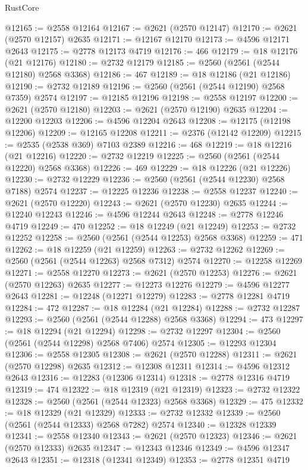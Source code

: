 \begin{lexlean}{RustCore}
\begin{coremodule}
@12165 := @2558 @12164
@12167 := @2621 (@2570 @12147)
@12170 := @2621 (@2570 @12157) @2635
@12171 := @12167 @12170
@12173 := @4596 @12171 @2643
@12175 := @2778 @12173 @4719
@12176 := 466
@12179 := @18 @12176 (@21 @12176)
@12180 := @2732 @12179
@12185 := @2560 (@2561 (@2544 @12180) @2568 @3368)
@12186 := 467
@12189 := @18 @12186 (@21 @12186)
@12190 := @2732 @12189
@12196 := @2560 (@2561 (@2544 @12190) @2568 @7359) @2574
@12197 := @12185 @12196
@12198 := @2558 @12197
@12200 := @2621 (@2570 @12180)
@12203 := @2621 (@2570 @12190) @2635
@12204 := @12200 @12203
@12206 := @4596 @12204 @2643
@12208 := @12175 (@12198 @12206)
@12209 := @12165 @12208
@12211 := @2376 (@12142 @12209)
@12215 := @2535 (@2538 @369) @7103 @2389
@12216 := 468
@12219 := @18 @12216 (@21 @12216)
@12220 := @2732 @12219
@12225 := @2560 (@2561 (@2544 @12220) @2568 @3368)
@12226 := 469
@12229 := @18 @12226 (@21 @12226)
@12230 := @2732 @12229
@12236 := @2560 (@2561 (@2544 @12230) @2568 @7188) @2574
@12237 := @12225 @12236
@12238 := @2558 @12237
@12240 := @2621 (@2570 @12220)
@12243 := @2621 (@2570 @12230) @2635
@12244 := @12240 @12243
@12246 := @4596 @12244 @2643
@12248 := @2778 @12246 @4719
@12249 := 470
@12252 := @18 @12249 (@21 @12249)
@12253 := @2732 @12252
@12258 := @2560 (@2561 (@2544 @12253) @2568 @3368)
@12259 := 471
@12262 := @18 @12259 (@21 @12259)
@12263 := @2732 @12262
@12269 := @2560 (@2561 (@2544 @12263) @2568 @7312) @2574
@12270 := @12258 @12269
@12271 := @2558 @12270
@12273 := @2621 (@2570 @12253)
@12276 := @2621 (@2570 @12263) @2635
@12277 := @12273 @12276
@12279 := @4596 @12277 @2643
@12281 := @12248 (@12271 @12279)
@12283 := @2778 @12281 @4719
@12284 := 472
@12287 := @18 @12284 (@21 @12284)
@12288 := @2732 @12287
@12293 := @2560 (@2561 (@2544 @12288) @2568 @3368)
@12294 := 473
@12297 := @18 @12294 (@21 @12294)
@12298 := @2732 @12297
@12304 := @2560 (@2561 (@2544 @12298) @2568 @7406) @2574
@12305 := @12293 @12304
@12306 := @2558 @12305
@12308 := @2621 (@2570 @12288)
@12311 := @2621 (@2570 @12298) @2635
@12312 := @12308 @12311
@12314 := @4596 @12312 @2643
@12316 := @12283 (@12306 @12314)
@12318 := @2778 @12316 @4719
@12319 := 474
@12322 := @18 @12319 (@21 @12319)
@12323 := @2732 @12322
@12328 := @2560 (@2561 (@2544 @12323) @2568 @3368)
@12329 := 475
@12332 := @18 @12329 (@21 @12329)
@12333 := @2732 @12332
@12339 := @2560 (@2561 (@2544 @12333) @2568 @7282) @2574
@12340 := @12328 @12339
@12341 := @2558 @12340
@12343 := @2621 (@2570 @12323)
@12346 := @2621 (@2570 @12333) @2635
@12347 := @12343 @12346
@12349 := @4596 @12347 @2643
@12351 := @12318 (@12341 @12349)
@12353 := @2778 @12351 @4719

\end{coremodule}
\end{lexlean}
